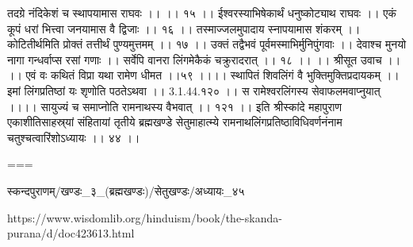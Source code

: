 तदग्रे नंदिकेशं च स्थापयामास राघवः ।। ।। १५ ।।
ईश्वरस्याभिषेकार्थं धनुष्कोट्याथ राघवः ।।
एकं कूपं धरां भित्त्वा जनयामास वै द्विजाः ।। १६ ।।
तस्माज्जलमुपादाय स्नापयामास शंकरम् ।।
कोटितीर्थमिति प्रोक्तं तत्तीर्थं पुण्यमुत्तमम् ।। १७ ।।
उक्तं तद्वैभवं पूर्वमस्माभिर्मुनिपुंगवाः ।।
देवाश्च मुनयो नागा गन्धर्वाप्स रसां गणाः ।।
सर्वेपि वानरा लिंगमेकैकं चक्रुरादरात् ।। १८ ।।
।। श्रीसूत उवाच ।। ।।
एवं वः कथितं विप्रा यथा रामेण धीमत ।।५९ ।।।।
स्थापितं शिवलिंगं वै भुक्तिमुक्तिप्रदायकम् ।।
इमां लिंगप्रतिष्ठां यः शृणोति पठतेऽथवा ।। 3.1.44.१२० ।।
स रामेश्वरलिंगस्य सेवाफलमवाप्नुयात् ।।।।
सायुज्यं च समाप्नोति रामनाथस्य वैभवात् ।। १२१ ।।
इति श्रीस्कांदे महापुराण एकाशीतिसाहस्र्यां संहितायां तृतीये ब्रह्मखण्डे सेतुमाहात्म्ये रामनाथलिंगप्रतिष्ठाविधिवर्णनंनाम चतुश्चत्वारिंशोऽध्यायः ।। ४४ ।।


===


स्कन्दपुराणम्/खण्डः_३_(ब्रह्मखण्डः)/सेतुखण्डः/अध्यायः_४५

https://www.wisdomlib.org/hinduism/book/the-skanda-purana/d/doc423613.html

